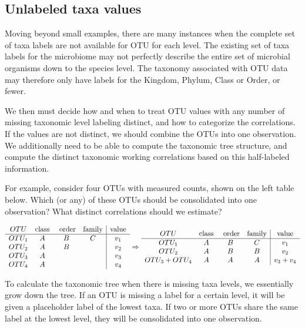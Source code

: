 \documentclass[12pt]{article}
\begin{document}
\subsection{Unlabeled taxa values}

Moving beyond small examples, there are many instances when the complete set of taxa labels are not available for OTU for each level. The existing set of taxa labels for the microbiome may not perfectly describe the entire set of microbial organisms down to the species level. The taxonomy associated with OTU data may therefore only have labels for the Kingdom, Phylum, Class or Order, or fewer.

We then must decide how and when to treat OTU values with any number of missing taxonomic level labeling distinct, and how to categorize the correlations. If the values are not distinct, we should combine the OTUs into one observation. We additionally need to be able to compute the taxonomic tree structure, and compute the distinct taxonomic working correlations based on this half-labeled information.

For example, consider four OTUs with measured counts, shown on the left table below. Which (or any) of these OTUs should be consolidated into one observation? What distinct correlations should we estimate?

\begin{singlespace}
$$\begin{array}{c c c c | c }
  OTU & \text{class} & \text{ order} & \text{family} & \text{value}\\
  \hline
  OTU_1 & A & B & C & v_1\\
  OTU_2 & A & B & & v_2\\
  OTU_3 & A & & & v_3 \\
  OTU_4 & A & & & v_4
\end{array}
\Rightarrow
\begin{array}{c c c c | c }
  OTU & \text{class} & \text{ order} & \text{family} & \text{value}\\
  \hline
  OTU_1 & A & B & C & v_1\\
  OTU_2 & A & B & B & v_2\\
  OTU_3 + OTU_4 & A & A & A & v_3 + v_4
\end{array}
 $$
\end{singlespace}


To calculate the taxonomic tree when there is missing taxa levels, we essentially grow down the tree. If an OTU is missing a label for a certain level, it will be given a placeholder label of the lowest taxa. If two or more OTUs share the same label at the lowest level, they will be consolidated into one observation.
\end{document}
